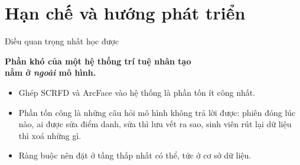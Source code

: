 \documentclass[aspectratio=169, 11pt]{beamer}
\begin{document}

\section{Hạn chế và hướng phát triển}

\begin{frame}{Điều quan trọng nhất học được}
  \vfill
  \begin{center}
    {\Large\bfseries\color{daumaroon}
     Phần khó của một hệ thống trí tuệ nhân tạo\\ nằm ở \emph{ngoài} mô hình.}
  \end{center}
  \vfill
  \begin{itemize}
    \item Ghép SCRFD và ArcFace vào hệ thống là phần tốn ít công nhất.
    \item Phần tốn công là những câu hỏi mô hình không trả lời được: phiên
          đóng lúc nào, ai được sửa điểm danh, sửa thì lưu vết ra sao, sinh
          viên rút lại dữ liệu thì xoá những gì.
    \item Ràng buộc nên đặt ở tầng thấp nhất có thể, tức ở cơ sở dữ liệu.
  \end{itemize}
\end{frame}
\end{document}
